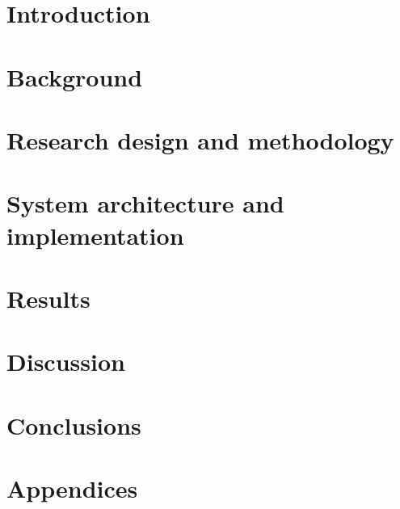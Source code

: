 \documentclass[a4paper, 11pt, openany]{book}
\begin{document}
\chapter{Introduction}
\label{ch:introduction}

\cleardoublepage

\chapter{Background}
\label{ch:background}

\cleardoublepage

\chapter{Research design and methodology}
\label{ch:methodology}

\cleardoublepage

\chapter{System architecture and implementation}
\label{ch:system-architecture-and-implementation}

\cleardoublepage

\chapter{Results}
\label{ch:results}

\cleardoublepage


\chapter{Discussion}
\label{ch:discussion}

\cleardoublepage


\chapter{Conclusions}
\label{ch:conclusions}

\cleardoublepage

\printbibliography[title={References}] %
\cleardoublepage

\chapter*{Appendices}
\renewcommand{\headrulewidth}{0pt}
\renewcommand{\thesection}{\Alph{section}}
\renewcommand{\thesubsection}{\thesection.\arabic{subsection}}
\setcounter{section}{0}
\renewcommand{\thefigure}{\thesection.\arabic{figure}}
\renewcommand{\thetable}{\thesection.\arabic{table}}

\end{document}
